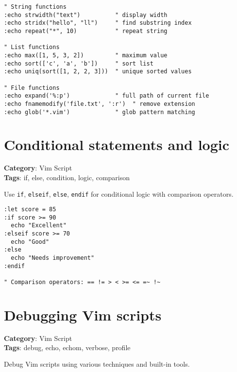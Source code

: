 {{{{{{{{{{{{{{{{{{{\begin{Exa*}{}
\begin{Verbatim}[fontsize=\footnotesize, breaklines, breakanywhere]
" String functions
:echo strwidth("text")          " display width
:echo stridx("hello", "ll")     " find substring index
:echo repeat("*", 10)           " repeat string

" List functions
:echo max([1, 5, 3, 2])         " maximum value
:echo sort(['c', 'a', 'b'])     " sort list
:echo uniq(sort([1, 2, 2, 3]))  " unique sorted values

" File functions
:echo expand('%:p')             " full path of current file
:echo fnamemodify('file.txt', ':r')  " remove extension
:echo glob('*.vim')             " glob pattern matching
\end{Verbatim}
\end{Exa*}

\section{Conditional statements and logic}

\textbf{Category}: Vim Script\\ \textbf{Tags}: if, else, condition, logic, comparison
\vspace{0.5cm}

Use {\footnotesize \Verb§if§}, {\footnotesize \Verb§elseif§}, {\footnotesize \Verb§else§}, {\footnotesize \Verb§endif§} for conditional logic with comparison operators.

\begin{Exa*}{}
\begin{Verbatim}[fontsize=\footnotesize, breaklines, breakanywhere]
:let score = 85
:if score >= 90
  echo "Excellent"
:elseif score >= 70
  echo "Good"
:else
  echo "Needs improvement"
:endif

" Comparison operators: == != > < >= <= =~ !~
\end{Verbatim}
\end{Exa*}

\section{Debugging Vim scripts}

\textbf{Category}: Vim Script\\ \textbf{Tags}: debug, echo, echom, verbose, profile
\vspace{0.5cm}

Debug Vim scripts using various techniques and built-in tools.

}}}}}}}}}}}}}}}}}}}
